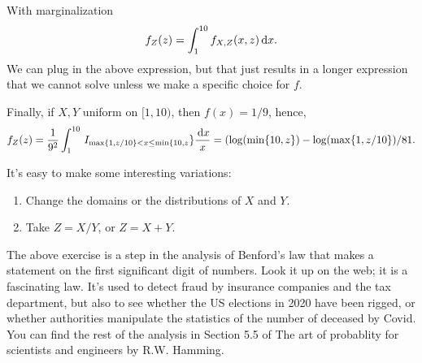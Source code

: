 \begin{exercise}
\begin{solution}
With marginalization
\begin{equation}
  \label{eq:21}
f_{Z}(z) =
\int_{1}^{10} f_{X,Z}(x,z) \,\textrm{d}x.
\end{equation}
We can plug in the above expression, but that just results in a longer expression that we cannot solve unless we make a specific choice for $f$.

Finally, if $X,Y$ uniform on $[1,10)$, then $f(x)=1/9$, hence,
\begin{align}
  \label{eq:21}
f_{Z}(z)
=\frac{1}{9^{2}}\int_{1}^{10}  \,I_{\max\{1, z/10\}< x \leq \min\{10, z}\} \frac{\,\textrm{d}x}{x}
=(\log(\min\{10, z\}) - \log(\max\{1, z/10\})/81.
\end{align}

It's easy to make some interesting variations:
\begin{enumerate}
\item Change the domains or the distributions of $X$ and $Y$.
\item Take $Z=X/Y$, or $Z=X+Y$.
\end{enumerate}

\end{solution}
\end{exercise}



\begin{remark}
  The above exercise is a step in the analysis of Benford's law that makes a statement on the first significant digit of numbers.
  Look it up on the web; it is a fascinating law.
  It's used to detect fraud by insurance companies and the tax department, but also to see whether the US elections in 2020 have been rigged, or whether authorities manipulate the statistics of the number of deceased by Covid.
  You can find the rest of the analysis in Section 5.5 of The art of probablity for scientists and engineers by R.W.
  Hamming.
\end{remark}





